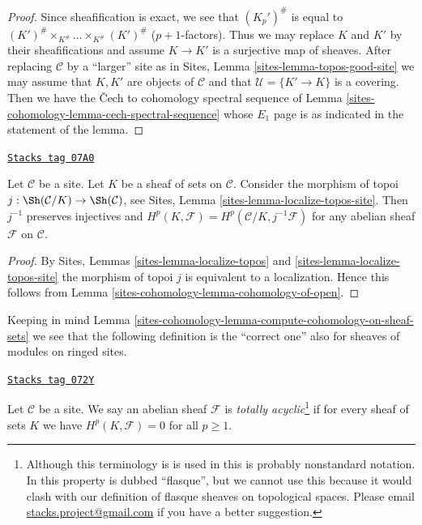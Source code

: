 \begin{proof}
Since sheafification is exact, we see that
$(K_p')^\#$ is equal to
$(K')^\# \times_{K^\#} \ldots \times_{K^\#} (K')^\#$
($p + 1$-factors). Thus we may replace $K$ and $K'$ by
their sheafifications and assume $K \to K'$ is a surjective
map of sheaves. After replacing $\mathcal{C}$ by a ``larger'' site as in
Sites, Lemma \ref{sites-lemma-topos-good-site}
we may assume that $K, K'$ are objects of $\mathcal{C}$ and that
$\mathcal{U} = \{K' \to K\}$ is a covering. Then we have the {\v C}ech
to cohomology spectral sequence of Lemma \ref{sites-cohomology-lemma-cech-spectral-sequence}
whose $E_1$ page is as indicated in the statement of the lemma.
\end{proof}

\begin{lemma}
\label{sites-cohomology-lemma-cohomology-on-sheaf-sets}
\href{https://stacks.math.columbia.edu/tag/07A0}{\texttt{Stacks tag 07A0}}

Let $\mathcal{C}$ be a site. Let $K$ be a sheaf of sets on $\mathcal{C}$.
Consider the morphism of topoi
$j : \Sh(\mathcal{C}/K) \to \Sh(\mathcal{C})$, see
Sites, Lemma \ref{sites-lemma-localize-topos-site}.
Then $j^{-1}$ preserves injectives and
$H^p(K, \mathcal{F}) = H^p(\mathcal{C}/K, j^{-1}\mathcal{F})$
for any abelian sheaf $\mathcal{F}$ on $\mathcal{C}$.
\end{lemma}

\begin{proof}
By
Sites, Lemmas \ref{sites-lemma-localize-topos} and
\ref{sites-lemma-localize-topos-site}
the morphism of topoi $j$ is
equivalent to a localization. Hence this follows from
Lemma \ref{sites-cohomology-lemma-cohomology-of-open}.
\end{proof}

Keeping in mind Lemma \ref{sites-cohomology-lemma-compute-cohomology-on-sheaf-sets}
we see that the following definition is the ``correct one'' also
for sheaves of modules on ringed sites.

\begin{definition}[Limp]
\label{sites-cohomology-definition-limp}
\href{https://stacks.math.columbia.edu/tag/072Y}{\texttt{Stacks tag 072Y}}

Let $\mathcal{C}$ be a site.
We say an abelian sheaf $\mathcal{F}$ is
{\it totally acyclic}\footnote{Although this terminology is is used in
\cite[Vbis, Proposition 1.3.10]{SGA4} this is probably nonstandard notation.
In \cite[V, Definition 4.1]{SGA4} this property is dubbed ``flasque'', but
we cannot use this because it would clash with our definition
of flasque sheaves on topological spaces. Please email
\href{mailto:stacks.project@gmail.com}{stacks.project@gmail.com}
if you have a better suggestion.}
if for every sheaf of sets $K$ we have $H^p(K, \mathcal{F}) = 0$
for all $p \geq 1$.
\end{definition}

